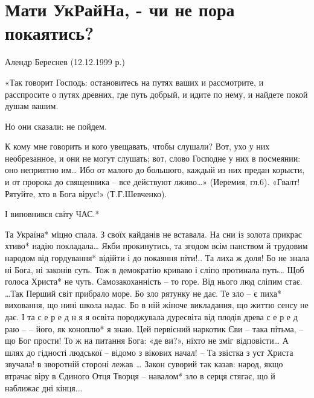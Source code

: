 
 
 
 
 

\section{Мати УкРайНа, - чи не пора покаятись?}

Алендр Береснев
(12.12.1999 р.)

«Так говорит Господь:  остановитесь на путях ваших и рассмотрите, и расспросите
о путях древних, где путь добрый, и идите по нему, и найдете покой душам вашим.

Но они сказали:  не пойдем.

К кому мне говорить и кого увещавать, чтобы слушали? Вот, ухо у них
необрезанное, и они не могут слушать;       вот, слово Господне у них в посмеянии:
оно неприятно им…   Ибо от малого до большого, каждый из них предан корысти,
и от пророка до священника – все действуют лживо…»  (Иеремия, гл.6).
«Гвалт! Рятуйте, хто в Бога вірує!»  (Т.Г.Шевченко).

І виповнився світу  ЧАС.*

Та Україна* міцно спала.
З своїх кайданів не вставала.
На сни із золота прикрас
хтиво* надію покладала…
     Якби прокинутись, та згодом
     всім панством й трудовим народом
     від гордування* відійти
     і до покаяння піти!..
Та лиха ж доля!   Бо не знала
ні  Бога,  ні законів суть.
Тож в демократію криваво
і сліпо протинала путь…
Щоб голоса Христа* не чуть.
     Самозакоханність – то горе.
     Від нього люд сліпим стає.
     …Так Перший світ прибрало море.
     Бо зло рятунку не дає.
Те зло – є пиха* виховання,
що нині школа надає.
Бо в ній жіноче викладання,
що життю сенсу не дає.
     І та  с е р е д н я я  освіта
     породжувала дуресвіта
     від плодів древа  с е р е д  раю –
     – його, як коноплю* я знаю.
Цей первісний наркотик Єви --
така пітьма, – що Бог прости!
То ж на питання Бога: «де ви?»,
ніхто не зміг відповісти…
     А шлях до гідності людської –
     відомо з вікових начал!
     – Та  звістка з уст Христа звучала!
     в зворотній стороні лежав …
              Закон суворий так казав:
              народ, якщо втрачає віру
              в Єдиного Отця  Творця –
              навалом* зло в серця стягає,
              що й наближає дні кінця...

